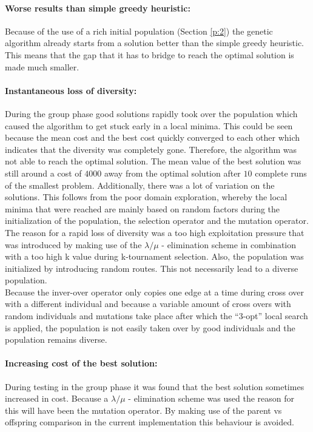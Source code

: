 \documentclass[a4paper,10pt]{article}
\begin{document}
\paragraph{Worse results than simple greedy heuristic:}Because of the use of a rich initial population (Section \ref{p:2}) the genetic algorithm already starts from a solution better than the simple greedy heuristic. This means that the gap that it has to bridge to reach the optimal solution is made much smaller.

\paragraph{Instantaneous loss of diversity:} During the group phase good solutions rapidly took over the population which caused the algorithm to get stuck early in a local minima. This could be seen because the mean cost and the best cost quickly converged to each other which indicates that the diversity was completely gone. Therefore, the algorithm was not able to reach the optimal solution. The mean value of the best solution was still around a cost of $4000$ away from the optimal solution after $10$ complete runs of the smallest problem. Additionally, there was a lot of variation on the solutions. This follows from the poor domain exploration, whereby the local minima that were reached are mainly based on random factors during the initialization of the population, the selection operator and the mutation operator. The reason for a rapid loss of diversity was a too high exploitation pressure that was introduced by making use of the $\lambda/\mu$ - elimination scheme in combination with a too high k value during k-tournament selection. Also, the population was initialized by introducing random routes. This not necessarily lead to a diverse population. \\ Because the inver-over operator only copies one edge at a time during cross over with a different individual and because a variable amount of cross overs with random individuals and mutations take place after which the ``3-opt'' local search is applied, the population is not easily taken over by good individuals and the population remains diverse.


\paragraph{Increasing cost of the best solution:} During testing in the group phase it was found that the best solution sometimes increased in cost. Because a $\lambda/\mu$ - elimination scheme was used the reason for this will have been the mutation operator. By making use of the parent vs offspring comparison in the current implementation this behaviour is avoided. 
\end{document}
